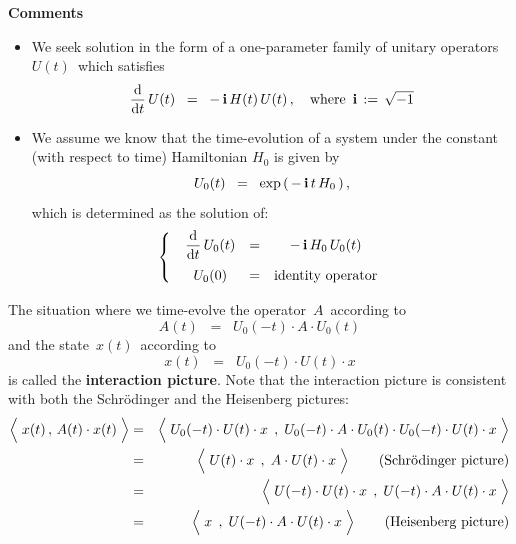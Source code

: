 \vskip 0.5cm
\noindent
\textbf{Comments}
\begin{itemize}
\item
	We seek solution in the form of a one-parameter family of unitary operators
	\,$U(t)$\, which satisfies
	\begin{equation*}
	\dfrac{\textnormal{d}}{\textnormal{d} t}\,U(t) \;\; = \;\; -\,\mathbf{i}\,H(t)\,U(t)\,,
	\quad
	\textnormal{where \,$\mathbf{i} \,:=\, \sqrt{-1}$}
	\end{equation*}
\item
	We assume we know that the time-evolution of a system under the constant (with respect to time)
	Hamiltonian $H_{0}$ is given by
	\begin{equation*}
	U_{0}(t) \;\; = \;\; \exp\left(\,-\,\mathbf{i}\,t\,H_{0}\,\right),
	\end{equation*}
	which is determined as the solution of:
	\begin{equation*}
	\left\{\;\;
		\begin{array}{ccc}
		\dfrac{\d}{\d t}\,U_{0}(t) & = & -\,\i\,H_{0}\,U_{0}(t)
		\\
		\overset{{\color{white}1}}{U_{0}(0)} & = & \textnormal{identity operator}
		\end{array}
		\right.
	\end{equation*}
\end{itemize}


\vskip 0.5cm
\noindent
The situation where we time-evolve the operator \,$A$\, according to
\begin{equation*}
A(t) \;\; = \;\; U_{0}(-t) \cdot A \cdot U_{0}(t)
\end{equation*}
and the state \,$x(t)$\, according to
\begin{equation*}
x(t) \;\; = \;\; U_{0}(-t) \cdot U(t) \cdot x
\end{equation*}
is called the \textbf{interaction picture}.
Note that the interaction picture is consistent with both the Schr\"odinger and the Heisenberg pictures:
\begin{eqnarray*}
\left\langle\; \overset{{\color{white}.}}{x(t)} \,,\, A(t) \cdot x(t) \;\right\rangle
& = &
	\left\langle\;
		\overset{{\color{white}.}}{U_{0}(-t)} \cdot U(t) \cdot x
		\;\,,\;
		U_{0}(-t) \cdot A \cdot U_{0}(t) \cdot U_{0}(-t) \cdot U(t) \cdot x
		\;\right\rangle
\\
& = &
	\left\langle\;
		\overset{{\color{white}.}}{U(t)} \cdot x
		\;\,,\;
		A \cdot U(t) \cdot x
		\;\right\rangle
	\quad\quad
	\textnormal{(Schr\"odinger picture)}
\\
& = &
	\left\langle\;
		\overset{{\color{white}.}}{U(-t)} \cdot U(t) \cdot x
		\;\,,\;
		U(-t) \cdot A \cdot U(t) \cdot x
		\;\right\rangle
\\
& = &
	\left\langle\;
		x
		\;\,,\;
		\overset{{\color{white}.}}{U(-t)} \cdot A \cdot U(t) \cdot x
		\;\right\rangle
	\quad\quad
	\textnormal{(Heisenberg picture)}
\end{eqnarray*}

